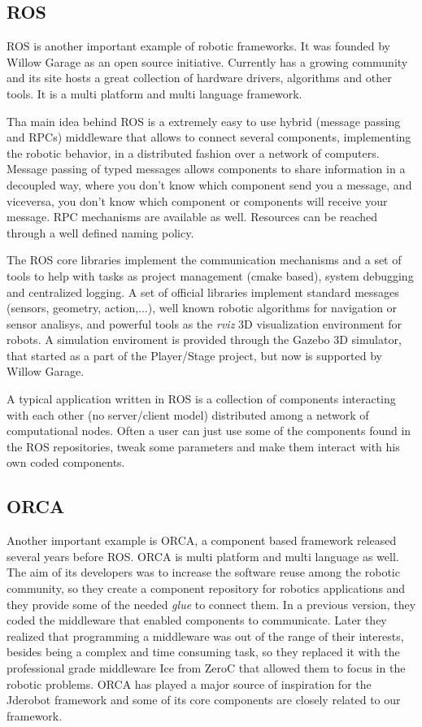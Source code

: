 \documentclass[twocolumn]{svjour3}          %
\begin{document}
\subsection{ROS}

ROS is another important example of robotic frameworks. It was founded by Willow Garage as an open source initiative. Currently has a growing community
and its site hosts a great collection of hardware drivers, algorithms
and other tools. It is a multi platform and multi language framework.

Tha main idea behind ROS is a extremely easy to use hybrid (message passing and RPCs) middleware that allows to connect several components, implementing the robotic behavior, in a distributed fashion over a network of computers. Message passing of typed messages allows components to share information in a decoupled way, where you don't know which component send you a message, and viceversa, you don't know which component or components will receive your message. RPC mechanisms are available as well. Resources can be reached through a well defined naming policy.

The ROS core libraries implement the communication mechanisms and a set of tools to help with tasks as project management (cmake based), system
debugging and centralized logging. A set of official libraries implement standard messages (sensors, geometry, action,...), well known robotic algorithms for navigation or sensor analisys, and powerful tools as the \textit{rviz} 3D visualization environment for robots. A simulation enviroment is provided through the Gazebo 3D simulator, that started as a part of the Player/Stage project, but now is supported by Willow Garage.

A typical application written in ROS is a collection of components interacting with each other (no server/client model) distributed among a network of computational nodes. Often a user can just use some of the components found in the ROS repositories, tweak some parameters and make them interact with his own coded components.

\subsection{ORCA}

Another important example is ORCA, a component based framework released several years before ROS. ORCA is multi platform and multi language as well. The aim of its developers was to increase the software reuse among the robotic community, so they create a component repository for robotics applications and they provide some of the needed \textit{glue} to connect them. In a previous version, they coded the middleware that enabled components to communicate. Later they realized that programming a middleware was out of the range of their interests, besides being a complex and time consuming task, so they replaced it with the professional grade middleware Ice from ZeroC \cite{henning04} that allowed them to focus in the robotic problems. ORCA has played a major source of inspiration for the Jderobot framework and some of its core components are closely related to our framework.
\end{document}
